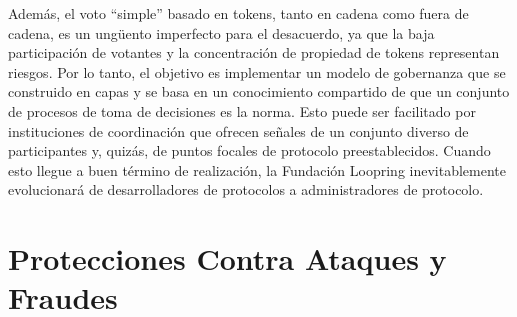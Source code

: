\documentclass[UTF8,nofonts]{article}
\begin{document}
\begin{multicols}{2}
Adem\'as, el voto \enquote{simple} basado en tokens, tanto en cadena como fuera de cadena, es un ung\"uento imperfecto para el desacuerdo, ya que la baja participaci\'on de votantes y la concentraci\'on de propiedad de tokens representan riesgos. Por lo tanto, el objetivo es implementar un modelo de gobernanza que se construido en capas y se basa en un conocimiento compartido de que un conjunto de procesos de toma de decisiones es la norma. Esto puede ser facilitado por instituciones de coordinaci\'on que ofrecen se\~nales de un conjunto diverso de participantes y, quiz\'as, de puntos focales de protocolo preestablecidos. Cuando esto llegue a buen t\'ermino de realizaci\'on, la Fundaci\'on Loopring inevitablemente evolucionar\'a de desarrolladores de protocolos a administradores de protocolo.



\section{Protecciones Contra Ataques y Fraudes}

\end{multicols}
\end{document}
